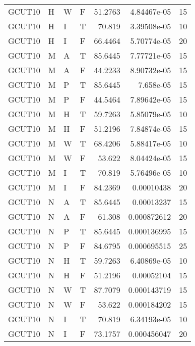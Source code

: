 \begin{table}[htb!]
{\begin{tabular}{llllrrr}
            GCUT10   & H     & W     & F          & 51.2763    & 4.84467e-05 & 15       \\
            GCUT10   & H     & I     & T          & 70.819     & 3.39508e-05 & 10       \\
            GCUT10   & H     & I     & F          & 66.4464    & 5.70774e-05 & 20       \\
            GCUT10   & M     & A     & T          & 85.6445    & 7.77721e-05 & 15       \\
            GCUT10   & M     & A     & F          & 44.2233    & 8.90732e-05 & 15       \\
            GCUT10   & M     & P     & T          & 85.6445    & 7.658e-05   & 15       \\
            GCUT10   & M     & P     & F          & 44.5464    & 7.89642e-05 & 15       \\
            GCUT10   & M     & H     & T          & 59.7263    & 5.85079e-05 & 10       \\
            GCUT10   & M     & H     & F          & 51.2196    & 7.84874e-05 & 15       \\
            GCUT10   & M     & W     & T          & 68.4206    & 5.88417e-05 & 10       \\
            GCUT10   & M     & W     & F          & 53.622     & 8.04424e-05 & 15       \\
            GCUT10   & M     & I     & T          & 70.819     & 5.76496e-05 & 10       \\
            GCUT10   & M     & I     & F          & 84.2369    & 0.00010438  & 20       \\
            GCUT10   & N     & A     & T          & 85.6445    & 0.00013237  & 15       \\
            GCUT10   & N     & A     & F          & 61.308     & 0.000872612 & 20       \\
            GCUT10   & N     & P     & T          & 85.6445    & 0.000136995 & 15       \\
            GCUT10   & N     & P     & F          & 84.6795    & 0.000695515 & 25       \\
            GCUT10   & N     & H     & T          & 59.7263    & 6.40869e-05 & 10       \\
            GCUT10   & N     & H     & F          & 51.2196    & 0.00052104  & 15       \\
            GCUT10   & N     & W     & T          & 87.7079    & 0.000143719 & 15       \\
            GCUT10   & N     & W     & F          & 53.622     & 0.000184202 & 15       \\
            GCUT10   & N     & I     & T          & 70.819     & 6.34193e-05 & 10       \\
            GCUT10   & N     & I     & F          & 73.1757    & 0.000456047 & 20       \\
            \hline
        \end{tabular}
    }{
    }
\end{table} 
